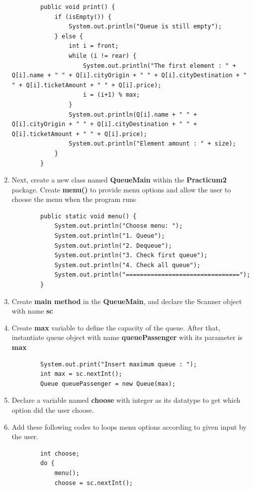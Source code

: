 \documentclass[12pt,titlepage]{article}
\begin{document}
\begin{enumerate}
\begin{verbatim}
        public void print() {
            if (isEmpty()) {
                System.out.println("Queue is still empty");
            } else {
                int i = front;
                while (i != rear) {
                    System.out.println("The first element : " + Q[i].name + " " + Q[i].cityOrigin + " " + Q[i].cityDestination + " " + Q[i].ticketAmount + " " + Q[i].price);
                    i = (i+1) % max;
                }
                System.out.println(Q[i].name + " " + Q[i].cityOrigin + " " + Q[i].cityDestination + " " + Q[i].ticketAmount + " " + Q[i].price);
                System.out.println("Element amount : " + size);
            }
        }
    \end{verbatim}
    \item Next, create a new class named \textbf{QueueMain} within the \textbf{Practicum2} package. Create \textbf{menu()} to provide menu options and allow the user to choose the menu when the program runs
    \begin{verbatim}
        public static void menu() {
            System.out.println("Choose menu: ");
            System.out.println("1. Queue");
            System.out.println("2. Dequeue");
            System.out.println("3. Check first queue");
            System.out.println("4. Check all queue");
            System.out.println("================================");
        }
    \end{verbatim}
    \item Create \textbf{main method} in the \textbf{QueueMain}, and declare the Scanner object with name \textbf{sc}
    \item Create \textbf{max} variable to define the capacity of the queue. After that, instantiate queue object with name \textbf{queuePassenger} with its parameter is \textbf{max}
    \begin{verbatim}
        System.out.print("Insert maximum queue : ");
        int max = sc.nextInt();
        Queue queuePassenger = new Queue(max);
    \end{verbatim}
    \item Declare a variable named \textbf{choose} with integer as its datatype to get which option did the user choose.
    \item Add these following codes to loops menu options according to given input by the user.
    \begin{verbatim}
        int choose;
        do {
            menu();
            choose = sc.nextInt();

\end{verbatim}
\end{enumerate}
\end{document}
